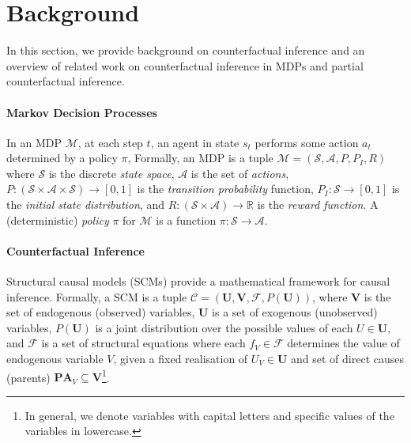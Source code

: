 \section{Background}
In this section, we provide background on counterfactual inference and an overview of related work on counterfactual inference in MDPs and partial counterfactual inference.

\paragraph{Markov Decision Processes}
 In an MDP $\mathcal{M}$, at each step $t$, an agent in state $s_t$ performs some action $a_t$ determined by a policy $\pi$, 
%
Formally, an MDP is a tuple $\mathcal{M}=(\mathcal{S},\mathcal{A},P,P_I,R)$ where $\mathcal{S}$ is the discrete \emph{state space}, $\mathcal{A}$ is the set of \emph{actions}, $P: (\mathcal{S} \times \mathcal{A} \times \mathcal{S}) \rightarrow [0,1]$ is the \emph{transition probability} function, $P_I:\mathcal{S} \rightarrow [0,1]$ is the \textit{initial state distribution}, and $R: (\mathcal{S} \times \mathcal{A}) \rightarrow \mathbb{R}$ is the \emph{reward function}. 
A (deterministic) \emph{policy} $\pi$ for $\mathcal{M}$ is a function $\pi: \mathcal{S} \rightarrow \mathcal{A}$. 

\paragraph{Counterfactual Inference} Structural causal models (SCMs) \citep{pearl_2009,halpern2005causes} provide a mathematical framework for causal inference. Formally, a SCM is a tuple $\mathcal{C}=(\mathbf{U},\mathbf{V},\mathcal{F},P(\mathbf{U}))$, where $\mathbf{V}$ is the set of endogenous (observed) variables, $\mathbf{U}$ is a set of exogenous (unobserved) variables, $P(\mathbf{U})$ is a joint distribution over the possible values of each $U \in \mathbf{U}$, and $\mathcal{F}$ is a set of structural equations where each $f_V \in \mathcal{F}$ determines the value of endogenous variable $V$, given a fixed realisation of $U_V\in \mathbf{U}$ and set of direct causes (parents) $\mathbf{PA}_V \subseteq \mathbf{V}$\footnote{In general, we denote variables with capital letters and specific values of the variables in lowercase.}.

